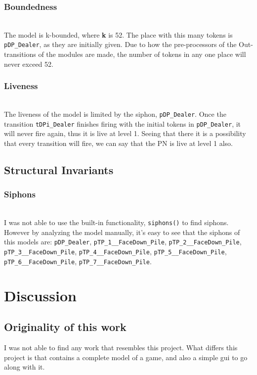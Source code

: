 \documentclass[runningheads,a4paper]{llncs}
\begin{document}
\subsubsection{Boundedness}~\\
The model is k-bounded, where \textbf{k} is 52. The place with this many tokens is \verb!pDP_Dealer!, as they are initially given. Due to how the pre-processors of the Out-transitions of the modules are made, the number of tokens in any one place will never exceed 52.
\subsubsection{Liveness}~\\
The liveness of the model is limited by the siphon, \verb!pDP_Dealer!. Once the transition \verb!tDPi_Dealer! finishes firing with the initial tokens in \verb!pDP_Dealer!, it will never fire again, thus it is live at level 1. Seeing that there it is a possibility that every transition will fire, we can say that the PN is live at level 1 also.
\subsection{Structural Invariants}
\label{sec:4_structural_invariants}
\subsubsection{Siphons}~\\
\label{sec:4_siphons}
I was not able to use the built-in functionality, \verb!siphons()! to find siphons. However by analyzing the model manually, it's easy to see that the siphons of this models are: \verb!pDP_Dealer!, \verb!pTP_1__FaceDown_Pile!, \verb!pTP_2__FaceDown_Pile!, \verb!pTP_3__FaceDown_Pile!, \verb!pTP_4__FaceDown_Pile!, \verb!pTP_5__FaceDown_Pile!, \\\verb!pTP_6__FaceDown_Pile!, \verb!pTP_7__FaceDown_Pile!.
\section{Discussion}
\subsection{Originality of this work}
I was not able to find any work that resembles this project. What differs this project is that contains a complete model of a game, and also a simple \ac{gui} to go along with it.
\end{document}
